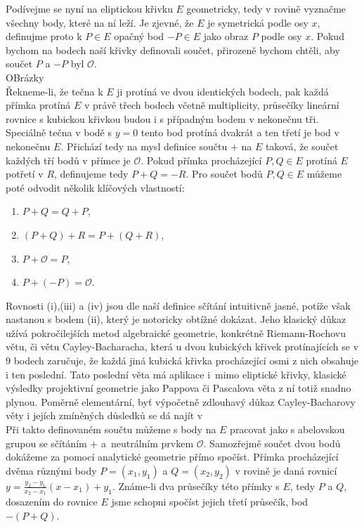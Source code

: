 \documentclass [12pt]{report}
\begin{document}
Podívejme se nyní na eliptickou křivku $E$ geometricky, tedy v rovině vyznačme všechny body, které na ní leží. Je zjevné, že $E$ je symetrická podle osy $x$, definujme proto k $P \in E$ opačný bod $-P \in E$ jako obraz $P$ podle osy $x$. Pokud bychom na bodech naší křivky definovali součet, přirozeně bychom chtěli, aby součet $P$ a $-P$ byl $\mathcal{O}$.\\

OBrázky\\

Řekneme-li, že tečna k $E$ ji protíná ve dvou identických bodech, pak každá přímka protíná $E$ v právě třech bodech včetně multiplicity, průsečíky lineární rovnice s kubickou křivkou budou i s případným bodem v nekonečnu tři. Speciálně tečna v bodě s $y=0$ tento bod protíná dvakrát a ten třetí je bod v nekonečnu $E$. Přichází tedy na mysl definice součtu $+$ na $E$ taková, že součet každých tří bodů v přímce je $\mathcal{O}$. Pokud přímka procházející $P,Q \in E$ protíná $E$ potřetí v $R$, definujeme tedy $P+ Q = -R$. Pro součet bodů $P,Q \in E$ můžeme poté odvodit několik klíčových vlastností:
\begin{enumerate}
\item $P + Q = Q + P$,
\item $(P + Q) + R =P + ( Q + R)$,
\item $P + \mathcal{O} = P$,
\item $P + (-P) = \mathcal{O}$.
\end{enumerate} 

Rovnosti (i),(iii) a (iv) jsou dle naší definice sčítání intuitivně jasné, potíže však nastanou s bodem (ii), který je notoricky obtížné dokázat. Jeho klasický důkaz užívá pokročilejších metod algebraické geometrie, konkrétně Riemann-Rochovu větu, či větu Cayley-Bacharacha, která u dvou kubických křivek protínajících se v $9$ bodech zaručuje, že každá jiná kubická křivka procházející osmi z nich obsahuje i ten poslední. Tato poslední věta má aplikace i~mimo eliptické křivky, klasické výsledky projektivní geometrie jako Pappova či Pascalova věta z ní totiž snadno plynou. Poměrně elementární, byť výpočetně zdlouhavý důkaz Cayley-Bacharovy věty i jejích zmíněných důsledků se dá najít v \cite[Sec. 2.3]{Washington}\\

Při takto definovaném součtu můžeme s body na $E$ pracovat jako s abelovskou grupou se sčítáním $+$ a~neutrálním prvkem $\mathcal{O}$. Samozřejmě součet dvou bodů dokážeme za pomocí analytické geometrie přímo spočíst. Přímka procházející dvěma různými body $P = (x_1,y_1)$ a $Q = (x_2,y_2)$ v rovině je daná rovnicí $y = \frac{y_2-y_1}{x_2-x_1} (x-x_1) + y_1$. Známe-li dva průsečíky této přímky s $E$, tedy $P$ a $Q$, dosazením do rovnice $E$ jsme schopni spočíst jejich třetí průsečík, bod $-(P+Q)$. \\
\end{document}
